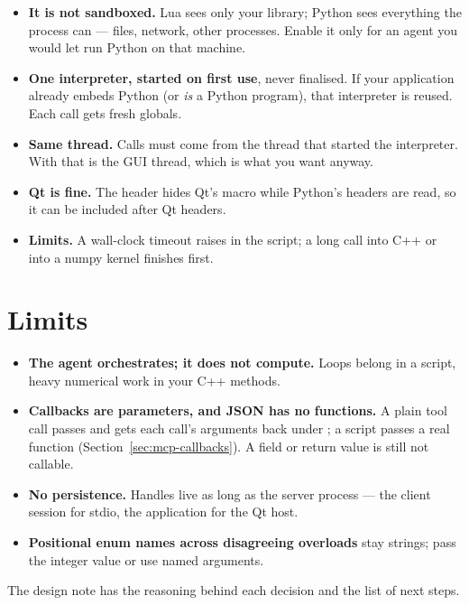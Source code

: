 \begin{itemize}
  \item \textbf{It is not sandboxed.} Lua sees only your library; Python sees
    everything the process can --- files, network, other processes. Enable it
    only for an agent you would let run Python on that machine.
  \item \textbf{One interpreter, started on first use}, never finalised. If your
    application already embeds Python (or \emph{is} a Python program), that
    interpreter is reused. Each  call gets fresh globals.
  \item \textbf{Same thread.} Calls must come from the thread that started the
    interpreter. With  that is the GUI thread, which is what
    you want anyway.
  \item \textbf{Qt is fine.} The header hides Qt's  macro while
    Python's headers are read, so it can be included after Qt headers.
  \item \textbf{Limits.} A wall-clock timeout raises  in the
    script; a long call into C++ or into a numpy kernel finishes first.
\end{itemize}

\section{Limits}

\begin{itemize}
  \item \textbf{The agent orchestrates; it does not compute.} Loops belong in
    a script, heavy numerical work in your C++ methods.
  \item \textbf{Callbacks are parameters, and JSON has no functions.} A plain
    tool call passes  and gets each call's
    arguments back under ; a script passes a real function
    (Section~\ref{sec:mcp-callbacks}). A  field or return
    value is still not callable.
  \item \textbf{No persistence.} Handles live as long as the server process
    --- the client session for stdio, the application for the Qt host.
  \item \textbf{Positional enum names across disagreeing overloads} stay
    strings; pass the integer value or use named arguments.
\end{itemize}

The design note  has the reasoning behind each decision and
the list of next steps.
